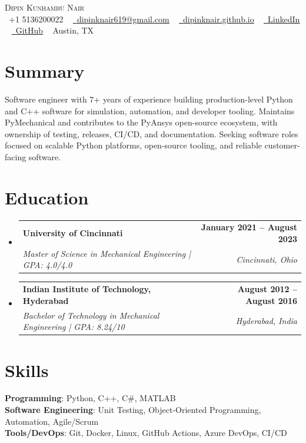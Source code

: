\documentclass[letterpaper,11pt]{article}
\makeatletter
\newcommand{\resumeSubheading}[4]{
  \vspace{-2pt}\item
    \begin{tabular*}{1.0\textwidth}[t]{l@{\extracolsep{\fill}}r}
      \textbf{#1} & \textbf{\small #2} \\
      \textit{\small#3} & \textit{\small #4} \\
    \end{tabular*}\vspace{-7pt}
}
\newcommand{\resumeSubHeadingListStart}{\begin{itemize}[leftmargin=0.0in, label={}]}
\newcommand{\resumeSubHeadingListEnd}{\end{itemize}}
\makeatother
\begin{document}
\begin{center}
    {\Huge \scshape Dipin Kunhambu Nair} \\ \vspace{1pt}
    \small \raisebox{-0.1\height}\faPhone\ +1 5136200022 ~ \href{mailto:dipinknair619@gmail.com}{\raisebox{-0.2\height}\faEnvelope\  \underline{dipinknair619@gmail.com}} ~ 
    \href{https://dipinknair.github.io/}{\raisebox{-0.2\height}\faGlobe\ \underline{dipinknair.github.io}} ~
    \href{https://linkedin.com/in/dipinknair619/}{\raisebox{-0.2\height}\faLinkedin\ \underline{LinkedIn}} ~
    \href{https://github.com/dipinknair}{\raisebox{-0.2\height}\faGithub\ \underline{GitHub}} ~
    Austin, TX
    \vspace{-8pt}
\end{center}

\section{Summary}
{Software engineer with 7+ years of experience building production-level Python and C++ software for simulation, automation, and developer tooling. Maintains PyMechanical and contributes to the PyAnsys open-source ecosystem, with ownership of testing, releases, CI/CD, and documentation. Seeking software roles focused on scalable Python platforms, open-source tooling, and reliable customer-facing software.}
\vspace{-8pt}

\section{Education}
  \resumeSubHeadingListStart
    \resumeSubheading
      {University of Cincinnati}{January 2021 -- August 2023}
      {Master of Science in Mechanical Engineering | GPA: 4.0/4.0}{Cincinnati, Ohio}
    \resumeSubheading
      {Indian Institute of Technology, Hyderabad}{August 2012 -- August 2016}
      {Bachelor of Technology in Mechanical Engineering | GPA: 8.24/10}{Hyderabad, India}
  \resumeSubHeadingListEnd
\vspace{-8pt}

\section{Skills}
 \begin{itemize}[leftmargin=0.15in, label={}]
    \small{\item{
     \textbf{Programming}{: Python, C++, C\#, MATLAB} \\
     \textbf{Software Engineering}{: Unit Testing, Object-Oriented Programming, Automation, Agile/Scrum} \\
     \textbf{Tools/DevOps}{: Git, Docker, Linux, GitHub Actions, Azure DevOps, CI/CD} \\
    }}
 \end{itemize}
 \vspace{-16pt}
\end{document}
